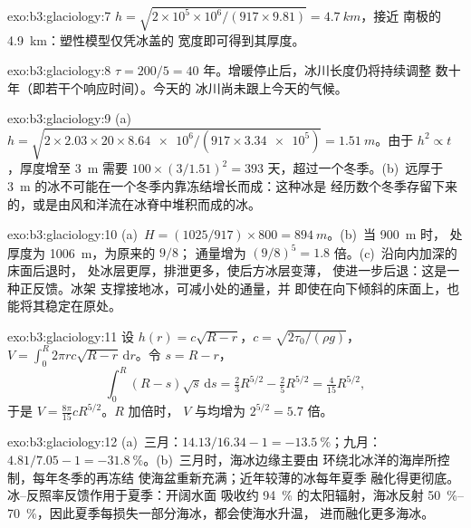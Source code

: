 \begin{solution}{exo:b3:glaciology:7}
$h = \sqrt{2\times10^5\times10^6/(917\times9.81)} = \qty{4.7}{km}$，接近
南极的 \qty{4.9}{km}：塑性模型仅凭冰盖的
宽度即可得到其厚度。
\end{solution}

\begin{solution}{exo:b3:glaciology:8}
$\tau = 200/5 = \num{40}\text{ 年}$。增暖停止后，冰川长度仍将持续调整
数十年（即若干个响应时间）。今天的
冰川尚未跟上今天的气候。
\end{solution}

\begin{solution}{exo:b3:glaciology:9}
(a)~$h = \sqrt{2\times2.03\times20\times\num{8.64e6}/(917\times\num{3.34e5})}
= \qty{1.51}{m}$。由于 $h^2 \propto t$，厚度增至 \qty{3}{m} 需要 $100\times
(3/1.51)^2 = 393$ 天，超过一个冬季。(b)~远厚于
\qty{3}{m} 的冰不可能在一个冬季内靠冻结增长而成：这种冰是
经历数个冬季存留下来的，或是由风和洋流在冰脊中堆积而成的冰。
\end{solution}

\begin{solution}{exo:b3:glaciology:10}
(a)~$H = (1025/917)\times800 = \qty{894}{m}$。(b)~当 \qty{900}{m} 时，
处厚度为 \qty{1006}{m}，为原来的 $9/8$；
通量增为 $(9/8)^5 = 1.8$ 倍。(c)~沿向内加深的床面后退时，
处冰层更厚，排泄更多，使后方冰层变薄，
使进一步后退：这是一种正反馈。冰架
支撑接地冰，可减小处的通量，并
即使在向下倾斜的床面上，也能将其稳定在原处。
\end{solution}

\begin{solution}{exo:b3:glaciology:11}
设 $h(r) = c\sqrt{R - r}$，$c = \sqrt{2\tau_0/(\rho g)}$，$V =
\int_0^R2\pi rc\sqrt{R - r}\,\mathrm dr$。令 $s = R - r$，
\[
\int_0^R(R - s)\sqrt s\,\mathrm ds = \tfrac23R^{5/2} - \tfrac25R^{5/2} =
\tfrac4{15}R^{5/2},
\]
于是 $V = \frac{8\pi}{15}cR^{5/2}$。$R$ 加倍时，
$V$ 与均增为 $2^{5/2} = 5.7$ 倍。
\end{solution}

\begin{solution}{exo:b3:glaciology:12}
(a)~三月：$14.13/16.34 - 1 = \qty{-13.5}{\percent}$；九月：$4.81/7.05
- 1 = \qty{-31.8}{\percent}$。(b)~三月时，海冰边缘主要由
环绕北冰洋的海岸所控制，每年冬季的再冻结
使海盆重新充满；近年较薄的冰每年夏季
融化得更彻底。冰–反照率反馈作用于夏季：开阔水面
吸收约 \qty{94}{\percent} 的太阳辐射，海冰反射
\qtyrange{50}{70}{\percent}，因此夏季每损失一部分海冰，都会使海水升温，
进而融化更多海冰。
\end{solution}

